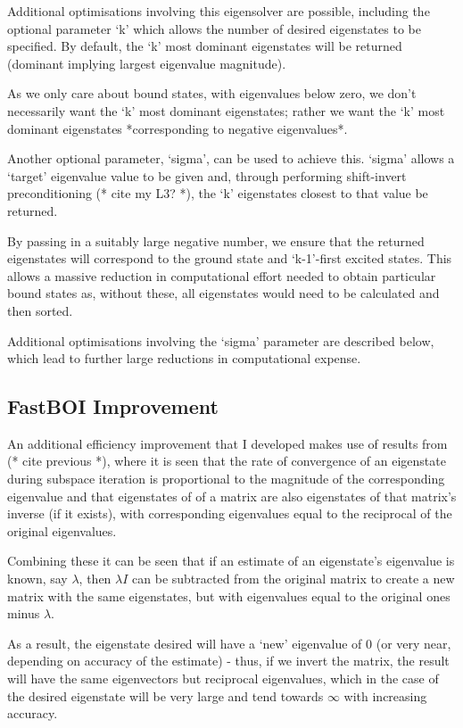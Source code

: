 Additional optimisations involving this eigensolver are possible, including the optional parameter `k' which allows the number of desired eigenstates to be specified. By default, the `k' most dominant eigenstates will be returned (dominant implying largest eigenvalue magnitude). 

As we only care about bound states, with eigenvalues below zero, we don't necessarily want the `k' most dominant eigenstates; rather we want the `k' most dominant eigenstates *corresponding to negative eigenvalues*. 

Another optional parameter, `sigma', can be used to achieve this. `sigma' allows a `target' eigenvalue value to be given and, through performing shift-invert preconditioning (* cite my L3? *), the `k' eigenstates closest to that value be returned. 

By passing in a suitably large negative number, we ensure that the returned eigenstates will correspond to the ground state and `k-1'-first excited states. This allows a massive reduction in computational effort needed to obtain particular bound states as, without these, all eigenstates would need to be calculated and then sorted. 

Additional optimisations involving the `sigma' parameter are described below, which lead to further large reductions in computational expense.

\subsection{FastBOI Improvement}
An additional efficiency improvement that I developed makes use of results from (* cite previous *), where it is seen that the rate of convergence of an eigenstate during subspace iteration is proportional to the magnitude of the corresponding eigenvalue and that eigenstates of of a matrix are also eigenstates of that matrix's inverse (if it exists), with corresponding eigenvalues equal to the reciprocal of the original eigenvalues. 

Combining these it can be seen that if an estimate of an eigenstate's eigenvalue is known, say $\lambda$, then $\lambda I$ can be subtracted from the original matrix to create a new matrix with the same eigenstates, but with eigenvalues equal to the original ones minus $\lambda$. 

As a result, the eigenstate desired will have a `new' eigenvalue of $0$ (or very near, depending on accuracy of the estimate) - thus, if we invert the matrix, the result will have the same eigenvectors but reciprocal eigenvalues, which in the case of the desired eigenstate will be very large and tend towards $\infty$ with increasing accuracy. 


